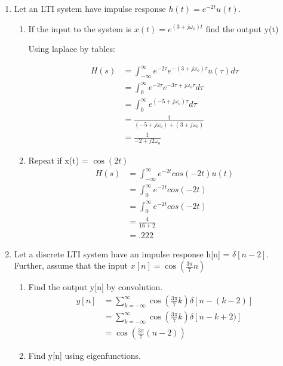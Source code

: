 \documentclass{article}
\begin{document}
\begin{enumerate}
    \newpage
    \item Let an LTI system have impulse response $h(t) = e^{-2t}u(t).$
    \begin{enumerate}
        \item If the input to the system is $x(t) = e^{(3+j\omega_o)t}$ find the output y(t)
        \begin{center}
            Using laplace by tables:
        \end{center}
        \begin{align}
            H(s) &=  \int^\infty_{-\infty}e^{-2\tau}e^{-(3+j\omega_o)\tau}u(\tau)d\tau\\
            &=  \int^\infty_{0}e^{-2\tau}e^{-3\tau+j\omega_o\tau}d\tau\\
            &=  \int^\infty_{0}e^{(-5+j\omega_o)\tau}d\tau\\
            &=  \frac{1}{(-5+j\omega_o)+(3+j\omega_o)}\\
            &=  \boxed{\frac{1}{-2+j2\omega_o}}
        \end{align}
        \item Repeat if x(t) = $\cos(2t)$
        \begin{align}
            H(s) &= \int^\infty_{-\infty} e^{-2t}cos(-2t)u(t)\\
            &= \int^\infty_{0} e^{-2t}cos(-2t)\\
            &= \int^\infty_{0} e^{-2t}cos(-2t)\\
            &= \frac{4}{16+2}\\
            &= \boxed{.222}
        \end{align}
    \end{enumerate}
    \newpage
    \item Let a discrete LTI system have an impulse response h[n] = $\delta[n-2]$. Further, assume that the input $x[n]=\cos(\frac{3\pi}{7}n)$
    \begin{enumerate}
        \item Find the output y[n] by convolution.
        \begin{align}
            y[n] &= \sum_{k=-\infty}^\infty \cos(\frac{3\pi}{7}k)\delta[n-(k-2)]\\
            &= \sum_{k=-\infty}^\infty \cos(\frac{3\pi}{7}k)\delta[n-k+2)]\\
            &= \boxed{\cos(\frac{3\pi}{7}(n-2))}
        \end{align}
        \item Find y[n] using eigenfunctions.
        \begin{align}

\end{align}
\end{enumerate}
\end{enumerate}
\end{document}
